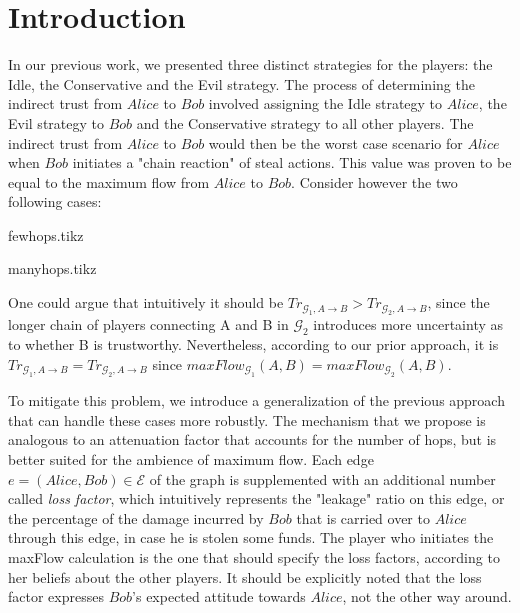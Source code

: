 \section{Introduction}
  In our previous work, we presented three distinct strategies for the players: the Idle, the Conservative and the Evil
  strategy. The process of determining the indirect trust from $Alice$ to $Bob$ involved assigning the Idle strategy to
  $Alice$, the Evil strategy to $Bob$ and the Conservative strategy to all other players. The indirect trust from $Alice$ to
  $Bob$ would then be the worst case scenario for $Alice$ when $Bob$ initiates a "chain reaction" of steal actions. This value
  was proven to be equal to the maximum flow from $Alice$ to $Bob$. Consider however the two following cases:

  {fewhops.tikz}

  {manyhops.tikz}

  One could argue that intuitively it should be $Tr_{\mathcal{G}_1, A \rightarrow B} > Tr_{\mathcal{G}_2, A \rightarrow B}$,
  since the longer chain of players connecting A and B in $\mathcal{G}_2$ introduces more uncertainty as to whether B is
  trustworthy. Nevertheless, according to our prior approach, it is $Tr_{\mathcal{G}_1, A \rightarrow B} = Tr_{\mathcal{G}_2,
  A \rightarrow B}$ since $maxFlow_{\mathcal{G}_1}\left(A, B\right) = maxFlow_{\mathcal{G}_2}\left(A, B\right)$.

  To mitigate this problem, we introduce a generalization of the previous approach that can handle these cases more
  robustly. The mechanism that we propose is analogous to an attenuation factor that accounts for the number of hops, but is
  better suited for the ambience of maximum flow. Each edge $e = \left(Alice, Bob\right) \in \mathcal{E}$ of the graph is
  supplemented with an additional number called \textit{loss factor}, which intuitively represents the "leakage" ratio on this
  edge, or the percentage of the damage incurred by $Bob$ that is carried over to $Alice$ through this edge, in case he is
  stolen some funds. The player who initiates the maxFlow calculation is the one that should specify the loss factors,
  according to her beliefs about the other players. It should be explicitly noted that the loss factor expresses $Bob$'s
  expected attitude towards $Alice$, not the other way around.

